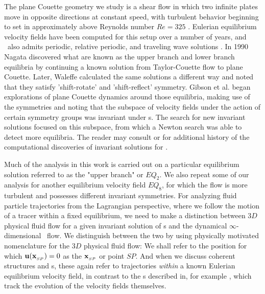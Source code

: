 The plane Couette geometry we study is a shear flow in which two infinite 
plates move in opposite directions at constant speed, with turbulent 
behavior beginning to set in approximately above Reynolds number $Re=325$ 
\cite{GHCV08}. Eulerian equilibrium velocity fields have been computed 
for this setup over a number of years, and \pCf\ also admits periodic, 
relative periodic, and traveling wave solutions \cite{GHCV08,DV04}.  In 
1990 Nagata \cite{N90} discovered what are known as the upper branch and 
lower branch equilibria by continuing a known solution from 
Taylor-Couette flow to plane Couette. Later, Waleffe \cite{W03} 
calculated the same solutions a different way and noted that they satisfy 
'shift-rotate' and 'shift-reflect' symmetry. Gibson et al. \cite{GHCW07} 
began explorations of plane Couette dynamics around those equilibria, 
making use of the symmetries and noting that the subspace of velocity 
fields under the action of certain symmetry groups was invariant under 
{\NSe}s. The search for new invariant solutions focused on this 
subspace, from which a Newton search was able to detect more equilibria. 
The reader may consult \cite{GHCV08} or \cite{GHCW07} for additional 
history of the computational discoveries of invariant solutions for 
{\pCf}. 

Much of the analysis in this work is carried out on a particular 
equilibrium solution referred to as the "upper branch" or $EQ_2$. We also 
repeat some of our analysis  for another equilibrium velocity field 
$EQ_8$, for which the flow is more turbulent and possesses different 
invariant symmetries. For analyzing fluid particle trajectories from the 
Lagrangian perspective, where we follow the motion of a tracer within a 
fixed equilibrium,  we need to make a distinction between $3D$ physical 
fluid flow for a given invariant solution of {\NSe}s and the dynamical 
$\infty$-dimensional \statesp\ flow. We distinguish between the two by 
using physically motivated nomenclature for the $3D$ physical fluid flow: 
We shall refer to the position for which ${\bf u}({\bf x}_{_{SP}})=0$ as the {\em 
\stagp} ${\bf x}_{_{SP}}$ or point $SP$. And when we discuss coherent 
structures and {\hc}s, these again refer to trajectories \textit{within} 
a known Eulerian equilibrium velocity field, in contrast to the {\hc}s 
described in, for example \cite{GHCV08}, which track the evolution of the 
velocity fields themselves. 

